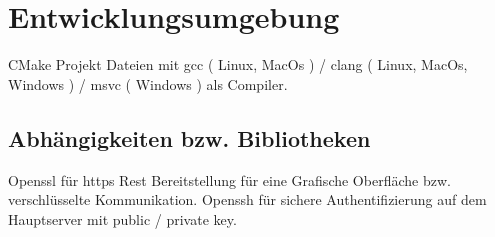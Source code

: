 \documentclass[a4paper,12pt]{article}
\begin{document}
\section{Entwicklungsumgebung}
CMake Projekt Dateien mit gcc ( Linux, MacOs ) / clang ( Linux, MacOs, Windows ) / msvc ( Windows ) als Compiler.
\subsection{Abhängigkeiten bzw. Bibliotheken}
Openssl für https Rest Bereitstellung für eine Grafische Oberfläche bzw. verschlüsselte Kommunikation.
Openssh für sichere Authentifizierung auf dem Hauptserver mit public / private key.

\clearpage
\printnoidxglossaries
\end{document}
